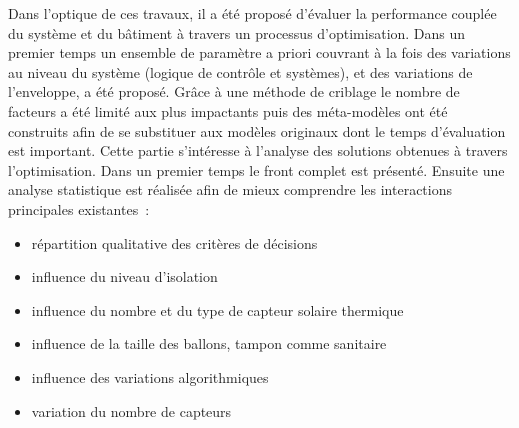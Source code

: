 Dans l’optique de ces travaux, il a été proposé d’évaluer la performance couplée
du système et du bâtiment à travers un processus d’optimisation. Dans un premier temps
un ensemble de paramètre a priori couvrant à la fois des variations
au niveau du système (logique de contrôle et systèmes), et des variations de l’enveloppe,
a été proposé. Grâce à une méthode de criblage le nombre de facteurs a été limité
aux plus impactants puis des méta-modèles ont été construits afin de se substituer
aux modèles originaux dont le temps d’évaluation est important.
Cette partie s’intéresse à l’analyse des solutions obtenues à travers l’optimisation.
Dans un premier temps le front complet est présenté. Ensuite une analyse statistique
est réalisée afin de mieux comprendre les interactions principales existantes~:
\begin{itemize}
  \item répartition qualitative des critères de décisions
  \item influence du niveau d’isolation
  \item influence du nombre et du type de capteur solaire thermique
  \item influence de la taille des ballons, tampon comme sanitaire
  \item influence des variations algorithmiques
  \item variation du nombre de capteurs 
\end{itemize}



